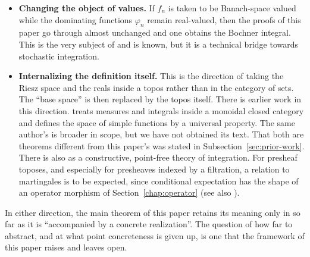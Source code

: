 \begin{itemize}
  \item \textbf{Changing the object of values.}
    If $f_n$ is taken to be Banach-space valued while the dominating functions
    $\varphi_n$ remain real-valued, then the proofs of this paper go through
    almost unchanged and one obtains the Bochner integral.
    This is the very subject of \cite{Mikusinski} and is known, but it is a
    technical bridge towards stochastic integration.
  \item \textbf{Internalizing the definition itself.}
    This is the direction of taking the Riesz space and the reals inside a topos
    rather than in the category of sets.
    The ``base space'' is then replaced by the topos itself.
    There is earlier work in this direction.
    \cite{Borger2010} treats measures and integrals inside a monoidal closed
    category and defines the space of simple functions by a universal property.
    The same author's \cite{BorgerHabil} is broader in scope, but we have not
    obtained its text.
    That both are theorems different from this paper's was stated in
    Subsection~\ref{sec:prior-work}.
    There is also \cite{CoquandSpitters} as a constructive, point-free theory of
    integration.
    For presheaf toposes, and especially for presheaves indexed by a filtration,
    a relation to martingales is to be expected, since conditional expectation
    has the shape of an operator morphism of
    Section~\ref{chap:operator} (see also \cite{Simpson}).
\end{itemize}

\noindent
In either direction, the main theorem of this paper retains its meaning only in
so far as it is ``accompanied by a concrete realization''.
The question of how far to abstract, and at what point concreteness is given up,
is one that the framework of this paper raises and leaves open.
